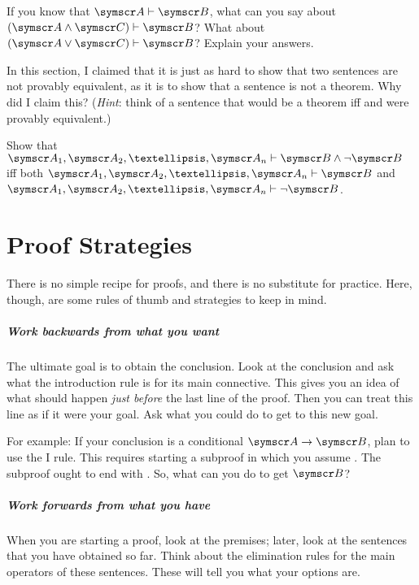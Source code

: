 \problempart
If you know that $\meta{A}\proves\meta{B}$, what can you say about $(\meta{A}\eand\meta{C})\proves\meta{B}$? What about $(\meta{A}\eor\meta{C})\proves\meta{B}$? Explain your answers.


\problempart In this section, I claimed that it is just as hard to show that two sentences are not provably equivalent, as it is to show that a sentence is not a theorem. Why did I claim this? (\emph{Hint}: think of a sentence that would be a theorem iff  and  were provably equivalent.)

\problempart Show that $\meta{A}_{1},\meta{A}_{2},…, \meta{A}_{n} \proves \meta{B}\eand\enot\meta{B}$ iff both $\meta{A}_{1},\meta{A}_{2},…, \meta{A}_{n} \proves \meta{B}$ and $\meta{A}_{1},\meta{A}_{2},…, \meta{A}_{n} \proves \enot\meta{B}$.



\chapter{Proof Strategies}\label{c:proof.strat}
There is no simple recipe for proofs, and there is no substitute for practice. Here, though, are some rules of thumb and strategies to keep in mind.




\paragraph{Work backwards from what you want}
The ultimate goal is to obtain the conclusion. Look at the conclusion and ask what the introduction rule is for its main connective. This gives you an idea of what should happen \emph{just before} the last line of the proof. Then you can treat this line as if it were your goal. Ask what you could do to get to this new goal. 

For example: If your conclusion is a conditional $\meta{A}\eif\meta{B}$, plan to use the {\eif}I rule. This requires starting a subproof in which you assume . The subproof ought to end with . So, what can you do to get $\meta{B}$?

\paragraph{Work forwards from what you have}
When you are starting a proof, look at the premises; later, look at the sentences that you have obtained so far. Think about the elimination rules for the main operators of these sentences. These will tell you what your options are.

